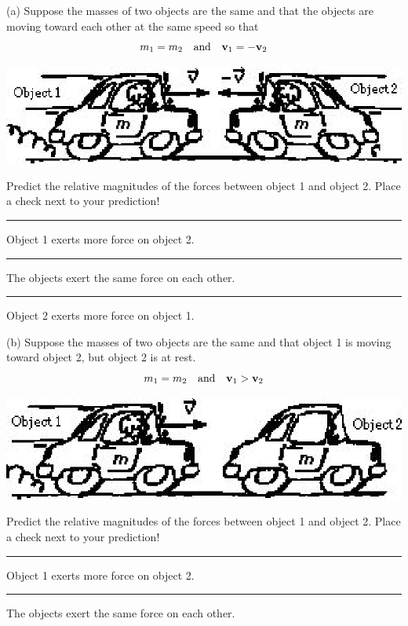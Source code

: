 (a) Suppose the masses of two objects are the same and that the objects are
moving toward each other at the same speed so that
\[
m_{1}=m_{2}\quad \mbox{and}\quad {{\bf v}_{1}}=-{{\bf v}_{2}}\]


\vspace{0.3cm}
{\par\centering \includegraphics{newtons_laws_fig1.eps} \par}
\vspace{0.3cm}

\newpage

Predict the relative magnitudes of the forces between object 1 and object 2.
Place a check next to your prediction! 

\rule{0.5in}{0.1pt} Object 1 exerts more force on object 2. 

\rule{0.5in}{0.1pt} The objects exert the same force on each other. 

\rule{0.5in}{0.1pt} Object 2 exerts more force on object 1.

(b) Suppose the masses of two objects are the same and that object 1 is moving
toward object 2, but object 2 is at rest.
\[
m_{1}=m_{2}\quad \mbox{and}\quad {{\bf v}_{1}}>{{\bf v}_{2}}\]


\vspace{0.3cm}
{\par\centering \includegraphics{newtons_laws_fig2.eps} \par}
\vspace{0.3cm}

Predict the relative magnitudes of the forces between object 1 and object 2.
Place a check next to your prediction! 

\rule{0.5in}{0.1pt} Object 1 exerts more force on object 2. 

\rule{0.5in}{0.1pt} The objects exert the same force on each other.

